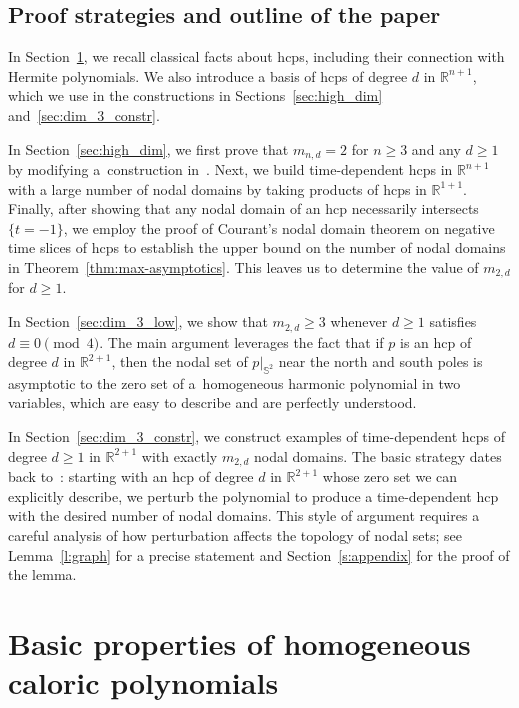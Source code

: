 \documentclass[10pt]{amsart}
\theoremstyle{definition}\newtheorem{defi}[theo]{Definition}\newtheorem{rema}[theo]{Remark}\newtheorem{exam}[theo]{Example}\newtheorem{exem}[theo]{Example}\newtheorem{nota}[theo]{Notation}
\newcommand{\R}{\mathbb{R}}
\newcommand{\sphere}{\mathbb{S}}
\begin{document}
\subsection{Proof strategies and outline of the paper} \label{ss:organize}


In Section~\ref{sec:prop}, we recall classical facts about hcps, including their connection with Hermite polynomials. We also introduce a basis of hcps of degree $d$ in $\R^{n+1}$, which we use in the constructions in Sections~\ref{sec:high_dim} and~\ref{sec:dim_3_constr}.

In Section~\ref{sec:high_dim}, we first prove that $m_{n,d} = 2$ for $n \ge 3$ and any $d \ge 1$ by modifying a~construction in~\cite{BET17}. Next, we build time-dependent hcps in $\R^{n+1}$ with a large number of nodal domains by taking products of hcps in $\R^{1+1}$. Finally, after showing that any nodal domain of an hcp necessarily intersects $\{t=-1\}$, we employ the proof of Courant's nodal domain theorem on negative time slices of hcps to establish the upper bound on the number of nodal domains in Theorem~\ref{thm:max-asymptotics}. This leaves us to determine the value of $m_{2,d}$ for $d \ge 1$.

In Section~\ref{sec:dim_3_low}, we show that $m_{2,d} \ge 3$ whenever $d \ge 1$ satisfies $d \equiv 0 \pmod 4$. The main argument leverages the fact that if $p$ is an hcp of degree $d$ in $\R^{2+1}$, then the nodal set of $p|_{\sphere^2}$ near the north and south poles is asymptotic to the zero set of a~homogeneous harmonic polynomial in two variables, which are easy to describe and are perfectly understood.

In Section~\ref{sec:dim_3_constr}, we construct examples of time-dependent hcps of degree $d \ge 1$ in $\R^{2+1}$ with exactly $m_{2,d}$ nodal domains. The basic strategy dates back to~\cite{Lewy77}: starting with an hcp of degree $d$ in $\R^{2+1}$ whose zero set we can explicitly describe, we perturb the polynomial to produce a time-dependent hcp with the desired number of nodal domains. This style of argument requires a careful analysis of how perturbation affects the topology of nodal sets; see Lemma~\ref{l:graph} for a precise statement and Section~\ref{s:appendix} for the proof of the lemma.


\section{Basic properties of homogeneous caloric polynomials}\label{sec:prop}
\end{document}
